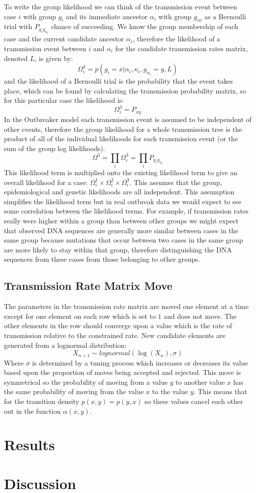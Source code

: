 \documentclass{amsbook}
\begin{document}
To write the group likelihood we can think of the transmission event between case $i$ with group $g_i$ and its immediate ancestor $\alpha_i$ with group $g_{\alpha{i}}$ as a Bernoulli trial with $P_{g_i g_{\alpha_i}}$ chance of succeeding. We know the group membership of each case and the current candidate ancestor $\alpha_i$, therefore the likelihood of a transmission event between $i$ and $\alpha_i$ for the candidate transmission rates matrix, denoted $L$, is given by:
\[ \Omega_i^3 = p(g_i = x | \alpha_i, \kappa_i, g_{\alpha_i}=y, L) \]
and the likelihood of a Bernoulli trial is the probability that the event takes place, which can be found by calculating the transmission probability matrix, so for this particular case the likelihood is:
\[ \Omega_i^3 = P_{xy} \]
In the Outbreaker model each transmission event is assumed to be independent of other events, therefore the group likelihood for a whole transmission tree is the product of all of the individual likelihoods for each transmission event (or the sum of the group log likelihoods).
\[ \Omega^3 = \prod_i{\Omega_i^3} = \prod_i{P_{g_i g_{\alpha_i}}} \]
This likelihood term is multiplied onto the existing likelihood term to give an overall likelihood for a case: $\Omega_i^1 \times \Omega_i^2 \times \Omega_i^3$. This assumes that the group, epidemiological and genetic likelihoods are all independent. This assumption simplifies the likelihood term but in real outbreak data we would expect to see some correlation between the likelihood terms. For example, if transmission rates really were higher within a group than between other groups we might expect that observed DNA sequences are generally more similar between cases in the same group because mutations that occur between two cases in the same group are more likely to stay within that group, therefore distinguishing the DNA sequences from these cases from those belonging to other groups.


\section{Transmission Rate Matrix Move}
The parameters in the transmission rate matrix are moved one element at a time except for one element on each row which is set to $1$ and does not move. The other elements in the row should converge upon a value which is the rate of transmission relative to the constrained rate. New candidate elements are generated from a lognormal distribution:
\[ X_{n+1} \sim lognormal(\log(X_n),\sigma) \]
Where $\sigma$ is determined by a tuning process which increases or decreases its value based upon the proportion of moves being accepted and rejected. This move is symmetrical so the probability of moving from a value $y$ to another value $x$ has the same probability of moving from the value $x$ to the value $y$. This means that for the transition density $p(x,y) = p(y,x)$ so these values cancel each other out in the function $\alpha(x,y)$.




\chapter{Results}
\chapter{Discussion}
\end{document}
